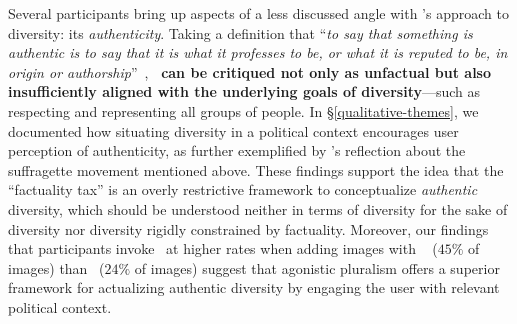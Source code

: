 
Several participants bring up aspects of a less discussed angle with \diverse's approach to diversity: its \textit{authenticity}.
Taking a definition that ``\textit{to say that something is authentic is to say that it is what it professes to be, or what it is reputed to be, in origin or authorship}''~\cite{sep-authenticity}, \textbf{\diverse~can be critiqued not only as unfactual but also insufficiently aligned with the underlying goals of diversity}---such as respecting and representing all groups of people.
In \S\ref{qualitative-themes}, we documented how situating diversity in a political context encourages user perception of authenticity, as further exemplified by 's reflection about the suffragette movement mentioned above.
These findings support the idea that the ``factuality tax'' is an overly restrictive framework to conceptualize \textit{authentic} diversity, which should be understood neither in terms of diversity for the sake of diversity nor diversity rigidly constrained by factuality.
Moreover, our findings that participants invoke \diversity~at higher rates when adding images with \agonistic~ ($45\%$ of images) than \diverse~($24\%$ of images) suggest that agonistic pluralism offers a superior framework for actualizing authentic diversity by engaging the user with relevant political context.  




